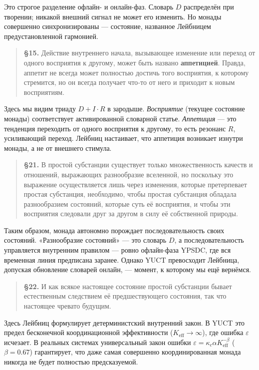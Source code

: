 \documentclass[12pt,a4paper]{article}
\begin{document}
	Это строгое разделение офлайн- и онлайн-фаз. Словарь \(D\) распределён при творении; никакой внешний сигнал не может его изменить. Но монады совершенно синхронизированы — состояние, названное Лейбницем предустановленной гармонией.
	
	\begin{quote}
		\textbf{§15.} Действие внутреннего начала, вызывающее изменение или переход от одного восприятия к другому, может быть названо \textbf{аппетицией}. Правда, аппетит не всегда может полностью достичь того восприятия, к которому стремится, но он всегда получает что‑то от него и приходит к новым восприятиям.
	\end{quote}
	
	Здесь мы видим триаду \(D+I\cdot R\) в зародыше. \emph{Восприятие} (текущее состояние монады) соответствует активированной словарной статье. \emph{Аппетиция} — это тенденция переходить от одного восприятия к другому, то есть резонанс \(R\), усиливающий переход. Лейбниц настаивает, что аппетиция возникает изнутри монады, а не от внешнего стимула.
	
	\begin{quote}
		\textbf{§21.} В простой субстанции существует только множественность качеств и отношений, выражающих разнообразие вселенной, но поскольку это выражение осуществляется лишь через изменения, которые претерпевает простая субстанция, необходимо, чтобы простая субстанция обладала разнообразием состояний, которые суть её восприятия, и чтобы эти восприятия следовали друг за другом в силу её собственной природы.
	\end{quote}
	
	Таким образом, монада автономно порождает последовательность своих состояний. «Разнообразие состояний» — это словарь \(D\), а последовательность управляется внутренним правилом — ровно офлайн-фаза YPSDC, где вся временная линия предписана заранее. Однако YUCT превосходит Лейбница, допуская обновление словарей онлайн, — момент, к которому мы ещё вернёмся.
	
	\begin{quote}
		\textbf{§22.} И как всякое настоящее состояние простой субстанции бывает естественным следствием её предшествующего состояния, так что настоящее чревато будущим.
	\end{quote}
	
	Здесь Лейбниц формулирует детерминистский внутренний закон. В YUCT это предел бесконечной координационной эффективности (\(K_{\mathrm{eff}} \to \infty\)), где ошибка \(\varepsilon\) исчезает. В реальных системах универсальный закон ошибки \(\varepsilon = \kappa_c \alpha K_{\mathrm{eff}}^{-\beta}\) (\(\beta=0.67\)) гарантирует, что даже самая совершенно координированная монада никогда не будет полностью предсказуемой.
	
\end{document}
